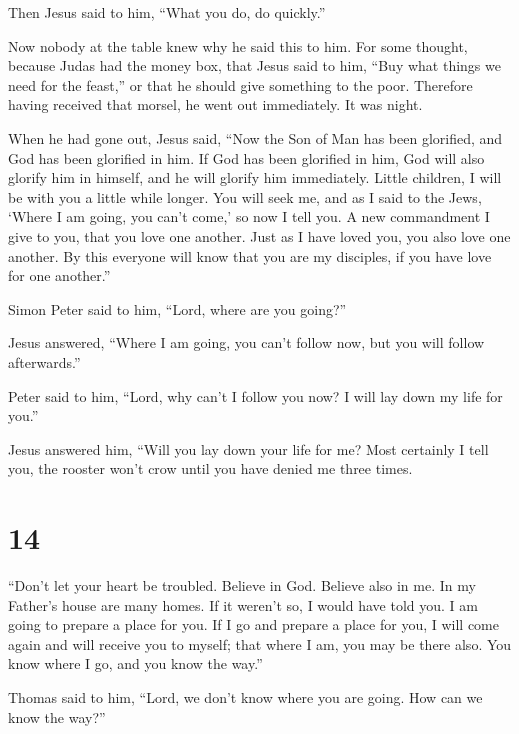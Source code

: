 Then Jesus said to him, ``What you do, do quickly.''

 Now nobody at the table knew why he said this to him.
 For some thought, because Judas had the money box, that
Jesus said to him, ``Buy what things we need for the feast,'' or that he
should give something to the poor.  Therefore having
received that morsel, he went out immediately. It was night.

 When he had gone out, Jesus said, ``Now the Son of Man
has been glorified, and God has been glorified in him. 
If God has been glorified in him, God will also glorify him in himself,
and he will glorify him immediately.  Little children, I
will be with you a little while longer. You will seek me, and as I said
to the Jews, `Where I am going, you can't come,' so now I tell you.
 A new commandment I give to you, that you love one
another. Just as I have loved you, you also love one another.
 By this everyone will know that you are my disciples, if
you have love for one another.''

 Simon Peter said to him, ``Lord, where are you going?''

Jesus answered, ``Where I am going, you can't follow now, but you will
follow afterwards.''

 Peter said to him, ``Lord, why can't I follow you now? I
will lay down my life for you.''

 Jesus answered him, ``Will you lay down your life for
me? Most certainly I tell you, the rooster won't crow until you have
denied me three times.

\hypertarget{section-13}{%
\section{14}\label{section-13}}

 ``Don't let your heart be troubled. Believe in God.
Believe also in me.  In my Father's house are many homes.
If it weren't so, I would have told you. I am going to prepare a place
for you.  If I go and prepare a place for you, I will come
again and will receive you to myself; that where I am, you may be there
also.  You know where I go, and you know the way.''

 Thomas said to him, ``Lord, we don't know where you are
going. How can we know the way?''

